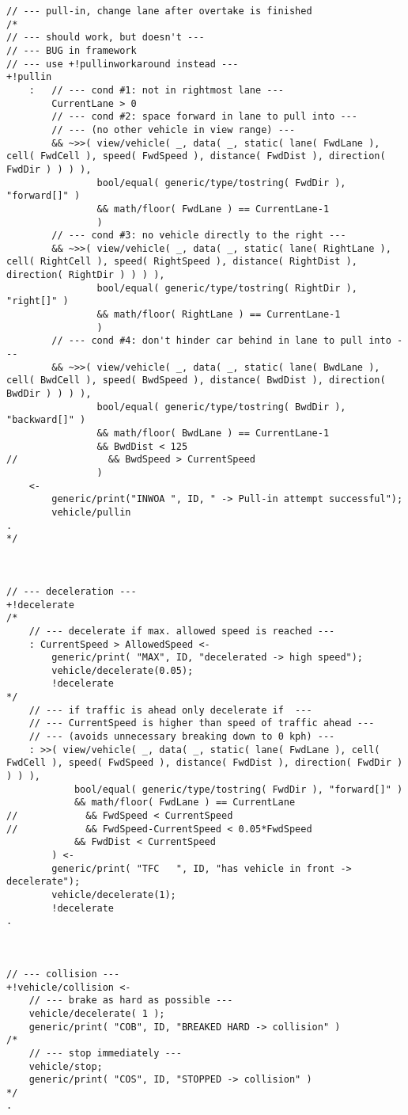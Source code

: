 \begin{lstlisting}
// --- pull-in, change lane after overtake is finished
/*
// --- should work, but doesn't ---
// --- BUG in framework
// --- use +!pullinworkaround instead ---
+!pullin
    :   // --- cond #1: not in rightmost lane ---
        CurrentLane > 0
        // --- cond #2: space forward in lane to pull into ---
        // --- (no other vehicle in view range) ---
        && ~>>( view/vehicle( _, data( _, static( lane( FwdLane ), cell( FwdCell ), speed( FwdSpeed ), distance( FwdDist ), direction( FwdDir ) ) ) ),
                bool/equal( generic/type/tostring( FwdDir ), "forward[]" ) 
                && math/floor( FwdLane ) == CurrentLane-1
                )
        // --- cond #3: no vehicle directly to the right ---
        && ~>>( view/vehicle( _, data( _, static( lane( RightLane ), cell( RightCell ), speed( RightSpeed ), distance( RightDist ), direction( RightDir ) ) ) ),
                bool/equal( generic/type/tostring( RightDir ), "right[]" ) 
                && math/floor( RightLane ) == CurrentLane-1
                )
        // --- cond #4: don't hinder car behind in lane to pull into ---
        && ~>>( view/vehicle( _, data( _, static( lane( BwdLane ), cell( BwdCell ), speed( BwdSpeed ), distance( BwdDist ), direction( BwdDir ) ) ) ),
                bool/equal( generic/type/tostring( BwdDir ), "backward[]" ) 
                && math/floor( BwdLane ) == CurrentLane-1
                && BwdDist < 125
//                && BwdSpeed > CurrentSpeed 
                )
    <-
        generic/print("INWOA ", ID, " -> Pull-in attempt successful");
        vehicle/pullin
.
*/



// --- deceleration ---
+!decelerate 
/*
    // --- decelerate if max. allowed speed is reached ---
    : CurrentSpeed > AllowedSpeed <-
        generic/print( "MAX", ID, "decelerated -> high speed");
        vehicle/decelerate(0.05);
        !decelerate
*/
    // --- if traffic is ahead only decelerate if  ---
    // --- CurrentSpeed is higher than speed of traffic ahead ---
    // --- (avoids unnecessary breaking down to 0 kph) ---
    : >>( view/vehicle( _, data( _, static( lane( FwdLane ), cell( FwdCell ), speed( FwdSpeed ), distance( FwdDist ), direction( FwdDir ) ) ) ), 
            bool/equal( generic/type/tostring( FwdDir ), "forward[]" ) 
            && math/floor( FwdLane ) == CurrentLane
//            && FwdSpeed < CurrentSpeed
//            && FwdSpeed-CurrentSpeed < 0.05*FwdSpeed
            && FwdDist < CurrentSpeed
        ) <-
        generic/print( "TFC   ", ID, "has vehicle in front -> decelerate");
        vehicle/decelerate(1);
        !decelerate
.



// --- collision ---
+!vehicle/collision <-
    // --- brake as hard as possible ---
    vehicle/decelerate( 1 );
    generic/print( "COB", ID, "BREAKED HARD -> collision" )
/*
    // --- stop immediately ---
    vehicle/stop;
    generic/print( "COS", ID, "STOPPED -> collision" )
*/
.
\end{lstlisting}


